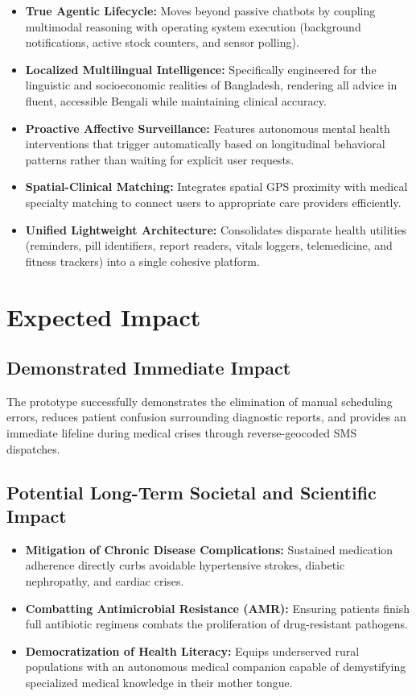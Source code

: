 \documentclass[12pt,a4paper,oneside]{report}
\begin{document}
\begin{itemize}
    \item \textbf{True Agentic Lifecycle:} Moves beyond passive chatbots by coupling multimodal reasoning with operating system execution (background notifications, active stock counters, and sensor polling).
    \item \textbf{Localized Multilingual Intelligence:} Specifically engineered for the linguistic and socioeconomic realities of Bangladesh, rendering all advice in fluent, accessible Bengali while maintaining clinical accuracy.
    \item \textbf{Proactive Affective Surveillance:} Features autonomous mental health interventions that trigger automatically based on longitudinal behavioral patterns rather than waiting for explicit user requests.
    \item \textbf{Spatial-Clinical Matching:} Integrates spatial GPS proximity with medical specialty matching to connect users to appropriate care providers efficiently.
    \item \textbf{Unified Lightweight Architecture:} Consolidates disparate health utilities (reminders, pill identifiers, report readers, vitals loggers, telemedicine, and fitness trackers) into a single cohesive platform.
\end{itemize}

\chapter{Expected Impact}

\section{Demonstrated Immediate Impact}
The prototype successfully demonstrates the elimination of manual scheduling errors, reduces patient confusion surrounding diagnostic reports, and provides an immediate lifeline during medical crises through reverse-geocoded SMS dispatches.

\section{Potential Long-Term Societal and Scientific Impact}
\begin{itemize}
    \item \textbf{Mitigation of Chronic Disease Complications:} Sustained medication adherence directly curbs avoidable hypertensive strokes, diabetic nephropathy, and cardiac crises.
    \item \textbf{Combatting Antimicrobial Resistance (AMR):} Ensuring patients finish full antibiotic regimens combats the proliferation of drug-resistant pathogens.
    \item \textbf{Democratization of Health Literacy:} Equips underserved rural populations with an autonomous medical companion capable of demystifying specialized medical knowledge in their mother tongue.
\end{itemize}
\end{document}
